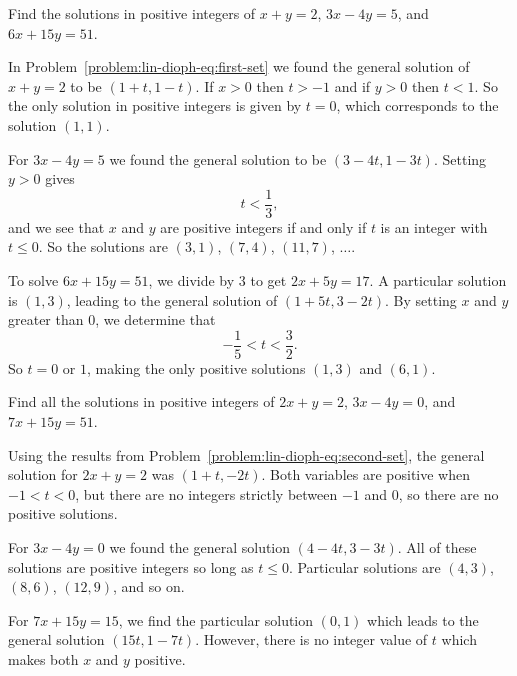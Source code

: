  Find the solutions in positive integers of $x + y = 2$,
$3x - 4y = 5$, and $6x + 15y = 51$.
\begin{solution}
  In Problem~\ref{problem:lin-dioph-eq:first-set} we found the general
  solution of $x + y = 2$ to be $(1+t,1-t)$. If $x > 0$ then $t > -1$
  and if $y > 0$ then $t < 1$. So the only solution in positive
  integers is given by $t = 0$, which corresponds to the solution
  $(1,1)$.

  For $3x - 4y = 5$ we found the general solution to be
  $(3 - 4t, 1 - 3t)$. Setting $y > 0$ gives
  \begin{equation*}
    t < \frac13,
  \end{equation*}
  and we see that $x$ and $y$ are positive integers if and only if $t$
  is an integer with $t\leq0$. So the solutions are $(3,1)$, $(7,4)$,
  $(11,7)$, $\dots$.

  To solve $6x + 15y = 51$, we divide by $3$ to get $2x + 5y = 17$. A
  particular solution is $(1,3)$, leading to the general solution of
  $(1+5t,3-2t)$. By setting $x$ and $y$ greater than $0$, we determine
  that
  \begin{equation*}
    -\frac15 < t < \frac32.
  \end{equation*}
  So $t = 0$ or $1$, making the only positive solutions $(1,3)$ and
  $(6,1)$.
\end{solution}

 Find all the solutions in positive integers of $2x + y = 2$,
$3x - 4y = 0$, and $7x + 15y = 51$.
\begin{solution}
  Using the results from
  Problem~\ref{problem:lin-dioph-eq:second-set}, the general solution
  for $2x + y = 2$ was $(1+t,-2t)$. Both variables are positive when
  $-1<t<0$, but there are no integers strictly between $-1$ and $0$,
  so there are no positive solutions.

  For $3x - 4y = 0$ we found the general solution $(4-4t,3-3t)$. All
  of these solutions are positive integers so long as
  $t\leq0$. Particular solutions are $(4,3)$, $(8,6)$, $(12,9)$, and
  so on.

  For $7x + 15y = 15$, we find the particular solution $(0,1)$ which
  leads to the general solution $(15t,1-7t)$. However, there is no
  integer value of $t$ which makes both $x$ and $y$ positive.
\end{solution}
